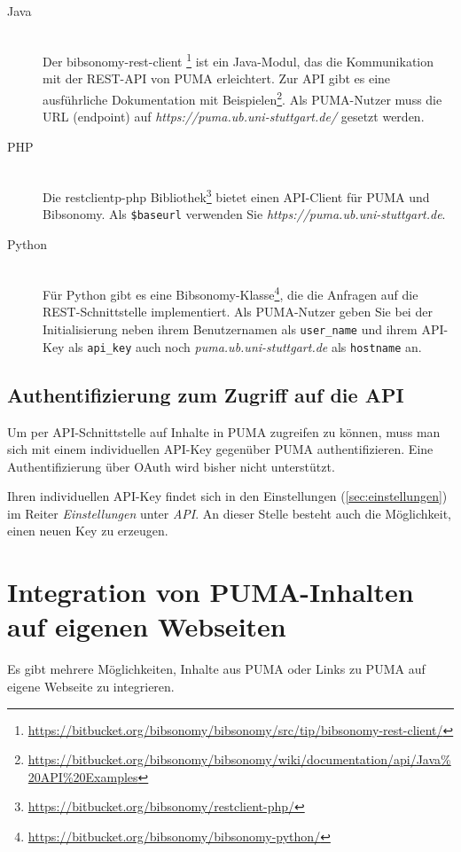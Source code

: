 \begin{description}
\item [Java] \hfill \\
  Der bibsonomy-rest-client \footnote{\url{https://bitbucket.org/bibsonomy/bibsonomy/src/tip/bibsonomy-rest-client/}} ist ein Java-Modul, das die Kommunikation mit der REST-API von PUMA erleichtert. Zur API gibt es eine ausführliche Dokumentation mit Beispielen\footnote{\url{https://bitbucket.org/bibsonomy/bibsonomy/wiki/documentation/api/Java\%20API\%20Examples}}. Als PUMA-Nutzer muss die URL (endpoint) auf \textit{https://puma.ub.uni-stuttgart.de/} gesetzt werden.
\item [PHP] \hfill \\
  Die restclientp-php Bibliothek\footnote{\url{https://bitbucket.org/bibsonomy/restclient-php/}} bietet einen API-Client für PUMA und Bibsonomy. Als \texttt{\$baseurl} verwenden Sie \textit{https://puma.ub.uni-stuttgart.de}.
\item [Python] \hfill \\
 Für Python gibt es eine Bibsonomy-Klasse\footnote{\url{https://bitbucket.org/bibsonomy/bibsonomy-python/}}, die die Anfragen auf die REST-Schnittstelle implementiert. Als PUMA-Nutzer geben Sie bei der Initialisierung neben ihrem Benutzernamen als \texttt{user\_name} und ihrem API-Key als \texttt{api\_key} auch noch \textit{puma.ub.uni-stuttgart.de} als \texttt{hostname} an.

\end{description}

\subsection{Authentifizierung zum Zugriff auf die API}
\label{subsec:apiAuth}\label{sss:apiKey}

Um per API-Schnittstelle auf Inhalte in PUMA zugreifen zu können, muss man sich  mit einem individuellen API-Key gegenüber PUMA authentifizieren. Eine Authentifizierung über OAuth wird bisher nicht unterstützt.

Ihren individuellen API-Key findet sich in den Einstellungen (\autoref{sec:einstellungen}) im Reiter \textit{Einstellungen} unter \textit{API}. An dieser Stelle besteht auch die Möglichkeit, einen neuen Key zu erzeugen. 

\section{Integration von PUMA-Inhalten auf eigenen Webseiten}
\label{sec:eigeneWebseiten}
Es gibt mehrere Möglichkeiten, Inhalte aus PUMA oder Links zu PUMA auf eigene Webseite zu integrieren.

